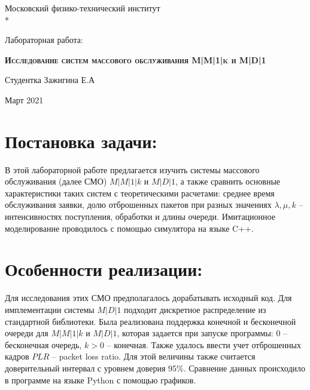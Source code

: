 \documentclass[a4paper,12 pt]{article}
\begin{document}
 \author{Зажигина Елизавета}
\begin{center}
	Московский физико-технический институт \\*
	\hrulefill
\end{center}

\vspace{8em}

\begin{center}
	\Large Лабораторная работа:
\end{center}

\vspace{2.5em}

\begin{center}
	\textsc{\textbf{Исследование систем массового обслуживания M|M|1|k и M|D|1
			\linebreak}}
\end{center}

\vspace{6em}

\begin{flushleft}
	Студентка \hrulefill Зажигина Е.А \\
	
\end{flushleft}

\vspace{\fill}

\begin{center}
	Март 2021
\end{center}
\newpage
\section*{Постановка задачи:}
В этой лабораторной работе предлагается изучить системы массового обслуживания (далее СМО) $M|M|1|k$ и $M|D|1$, а также сравнить основные характеристики таких систем с теоретическими расчетами: среднее время обслуживания заявки, долю отброшенных пакетов при разных значениях $\lambda, \mu, k$ -- интенсивностях поступления, обработки и длины очереди. Имитационное моделирование проводилось с помощью симулятора на языке C++.

\section*{Особенности реализации:}
Для исследования этих СМО предполагалось дорабатывать исходный код. Для имплементации системы $M|D|1$ подходит дискретное распределение из стандартной библиотеки. Была реализована поддержка конечной и бесконечной очереди для $M|M|1|k$ и $M|D|1$, которая задается при запуске программы: $0$ -- бесконечная очередь, $k > 0$ -- конечная. Также удалось ввести учет отброшенных кадров $PLR$ -- packet loss ratio. Для этой величины также считается доверительный интервал с уровнем доверия 95\%. Сравнение данных происходило в программе на языке Python с помощью графиков. 
\end{document}
